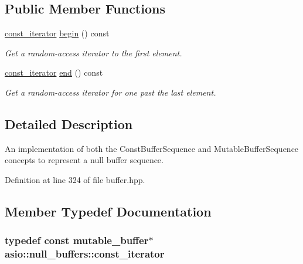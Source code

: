 \subsection*{Public Member Functions}
\begin{DoxyCompactItemize}
\item 
\hyperlink{classasio_1_1null__buffers_abdfa728f93ea0d07637fd1183be3be28}{const\+\_\+iterator} \hyperlink{classasio_1_1null__buffers_a1a972bd89bfb7020f661e80210fb0ddd}{begin} () const 
\begin{DoxyCompactList}\small\item\em Get a random-\/access iterator to the first element. \end{DoxyCompactList}\item 
\hyperlink{classasio_1_1null__buffers_abdfa728f93ea0d07637fd1183be3be28}{const\+\_\+iterator} \hyperlink{classasio_1_1null__buffers_a82de7e76f018d36f6103675c5c378fea}{end} () const 
\begin{DoxyCompactList}\small\item\em Get a random-\/access iterator for one past the last element. \end{DoxyCompactList}\end{DoxyCompactItemize}


\subsection{Detailed Description}
An implementation of both the Const\+Buffer\+Sequence and Mutable\+Buffer\+Sequence concepts to represent a null buffer sequence. 

Definition at line 324 of file buffer.\+hpp.



\subsection{Member Typedef Documentation}
\hypertarget{classasio_1_1null__buffers_abdfa728f93ea0d07637fd1183be3be28}{}
\subsubsection[{const\+\_\+iterator}]{\setlength{\rightskip}{0pt plus 5cm}typedef const {\bf mutable\+\_\+buffer}$\ast$ {\bf asio\+::null\+\_\+buffers\+::const\+\_\+iterator}}\label{classasio_1_1null__buffers_abdfa728f93ea0d07637fd1183be3be28}


